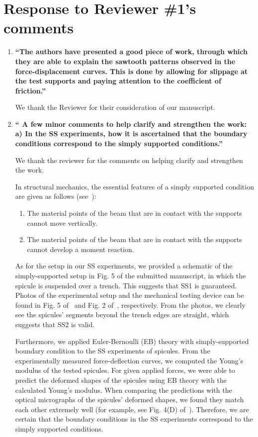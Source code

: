 \documentclass[11pt,letterpaper]{report}
\begin{document}
\clearpage
\section*{Response to Reviewer \#1's comments}
\label{rev1}

\begin{enumerate}[label=\textit{1.\arabic*},wide, labelwidth=!, labelindent=0pt]

\item \label{r1c1} {\bf ``The authors have presented a good piece of work, through which they are able to explain the sawtooth patterns observed in the force-displacement curves. This is done by allowing for slippage at the test supports and paying attention to the coefficient of friction.''}

We thank the Reviewer for their consideration of our manuscript.

\item \label{r1c2} {\bf `` A few minor comments to help clarify and strengthen the work: a) In the SS experiments, how it is ascertained that the boundary conditions correspond to the simply supported conditions.''}

We thank the reviewer for the comments on helping clarify and strengthen the work.

In structural mechanics, the essential features of a simply supported condition are given as follows (see~\cite{gere1997mechanics}):
\begin{enumerate}[label=\textit{(SS\arabic*).},leftmargin = 1.5 cm]
\item The material points of the beam that are in contact with the supports cannot move vertically.
\item The material points of the beam that are in contact with the supports cannot develop a moment reaction.
\end{enumerate}


As for the setup in our SS experiments, we provided a schematic of the simply-supported setup in Fig. 5 of the submitted manuscript, in which the spicule is suspended over a trench. This suggests that SS1 is guaranteed. Photos of the experimental setup and the mechanical testing device can be found in Fig. 5 of~\cite{kochiyama2021sawtooth} and Fig. 2 of~\cite{monn2017enhanced}, respectively. From the photos, we clearly see the spicules' segments beyond the trench edges are straight, which suggests that SS2 is valid. 

Furthermore, we applied Euler-Bernoulli (EB) theory with simply-supported boundary condition to the SS experiments of spicules. From the experimentally measured force-deflection curves, we computed the Young's modulus of the tested spicules. For given applied forces, we were able to predict the deformed shapes of the spicules using EB theory with the calculated Young's modulus. When comparing the predictions with the optical micrographs of the spicules' deformed shapes, we found they match each other extremely well (for example, see Fig. 4(D) of~\cite{monn2017enhanced}). Therefore, we are certain that the boundary conditions in the SS experiments correspond to the simply supported conditions.



\end{enumerate}
\end{document}
